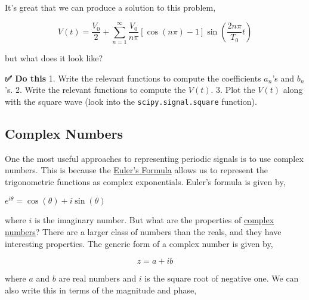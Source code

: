 It's great that we can produce a solution to this problem,

\[V(t) = \dfrac{V_0}{2} + \sum_{n=1}^{\infty} \dfrac{V_0}{n\pi}\left[\cos(n\pi)-1\right]\sin\left(\dfrac{2n\pi}{T_0}t\right)\]

but what does it look like?

\textbf{✅ Do this} 1. Write the relevant functions to compute the
coefficients \(a_n\)'s and \(b_n\)'s. 2. Write the relevant functions to
compute the \(V(t)\). 3. Plot the \(V(t)\) along with the square wave
(look into the \texttt{scipy.signal.square} function).

\begin{Shaded}
\begin{Highlighting}[]
\OperatorTok{\%}
\end{Highlighting}
\end{Shaded}

\begin{Shaded}
\begin{Highlighting}[]
\end{Highlighting}
\end{Shaded}

\subsection{Complex Numbers}\label{complex-numbers}

One the most useful approaches to representing periodic signals is to
use complex numbers. This is because the
\href{https://en.wikipedia.org/wiki/Euler\%27s_formula}{Euler's Formula}
allows us to represent the trigonometric functions as complex
exponentials. Euler's formula is given by,

\(e^{i\theta} = \cos(\theta) + i\sin(\theta)\)

where \(i\) is the imaginary number. But what are the properties of
\href{https://en.wikipedia.org/wiki/Complex_number}{complex numbers}?
There are a larger class of numbers than the reals, and they have
interesting properties. The generic form of a complex number is given
by,

\[z = a + ib\]

where \(a\) and \(b\) are real numbers and \(i\) is the square root of
negative one. We can also write this in terms of the magnitude and
phase,

